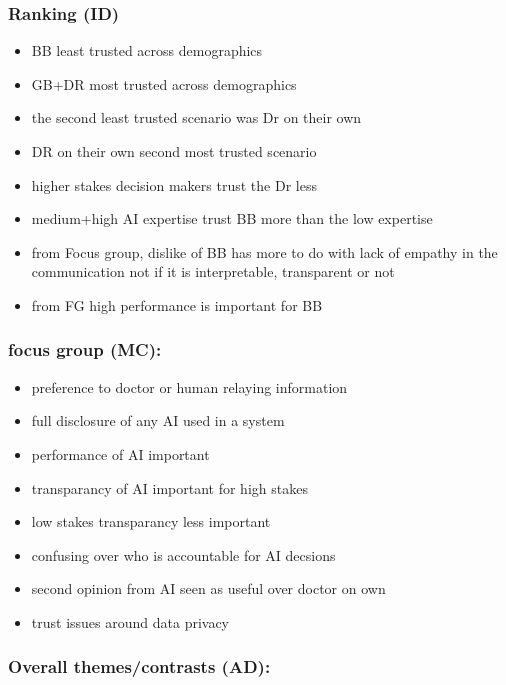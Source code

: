 \documentclass[manuscript,screen,review]{acmart}
\begin{document}
\subsubsection{Ranking (ID)}
\begin{itemize}
    \item BB least trusted across demographics
    \item GB+DR most trusted across demographics
    \item the second least trusted scenario was Dr on their own
    \item DR on their own second most trusted scenario
    \item higher stakes decision makers trust the Dr less
    \item medium+high AI expertise trust BB more than the low expertise
    \item from Focus group, dislike of BB has more to do with lack of empathy in the communication not if it is interpretable, transparent or not
    \item from FG high performance is important for BB
\end{itemize}

\subsubsection{focus group (MC):}
\begin{itemize}
    \item preference to doctor or human relaying information
    \item full disclosure of any AI used in a system
    \item performance of AI important
    \item transparancy of AI important for high stakes
    \item low stakes transparancy less important
    \item confusing over who is accountable for AI decsions
    \item second opinion from AI seen as useful over doctor on own
    \item trust issues around data privacy
\end{itemize}

\subsubsection{Overall themes/contrasts (AD):}
\end{document}
